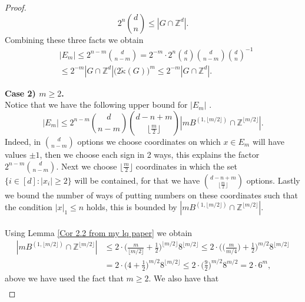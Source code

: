 \documentclass[a4paper,oneside, reqno]{amsart}
\numberwithin{equation}{section}
\theoremstyle{definition}%
\theoremstyle{definition}
\theoremstyle{definition}%
\theoremstyle{definition}
\newcommand{\Z}{\mathbb{Z}}
\begin{document}
\begin{proof}
\begin{equation}
 2^n \binom{d}{n} \leq |G \cap \mathbb{Z}^d |.
\end{equation}
Combining these three facts we obtain
\begin{align*}
    &|E_m| \le 2^{n-m} \binom{d}{n-m}= 2^{-m} \cdot 2^{n} \binom{d}{n} \binom{d}{n-m}  \binom{d}{n}^{-1} \\
    &\le 2^{-m} |G \cap \Z^d| \Big( 2\widetilde{\kappa}(G)\Big)^m \le 2^{-m} |G \cap \Z^d|.
\end{align*}
\par \textbf{Case 2) $m \ge 2$.} \\
Notice that we have the following upper bound for $|E_m|$ . 
\begin{equation} \label{eq:3.3}
|E_m| \leq 2^{n-m} \binom{d}{n-m} \binom{d-n+m}{\lfloor \frac{m}{2} \rfloor} |mB^{(1,\lfloor m/2 \rfloor)} \cap \mathbb{Z}^{\lfloor m/2\rfloor} |. 
\end{equation}
Indeed, in $\binom{d}{n-m}$ options we choose coordinates on which $x \in E_m$ will have values $\pm 1$, then we choose each sign in 2 ways, this explains the factor $2^{n-m} \binom{d}{n-m}$. Next we choose $\lfloor \frac{m}{2} \rfloor$ coordinates  in which the set $\lbrace i \in [d]: |x_i| \geq 2 \rbrace$ will be contained, for that we have $\binom{d-n+m}{\lfloor \frac{m}{2} \rfloor}$ options. Lastly we bound the number of ways of putting numbers on these coordinates such that the condition $| x |_{1} \leq n$ holds, this is bounded by $|mB^{(1,\lfloor m/2 \rfloor)} \cap \mathbb{Z}^{\lfloor m/2 \rfloor}|$. \\ \\
Using Lemma \ref{Cor 2.2 from my lq paper} we obtain 
\begin{equation} \label{eq:3.4}
    \begin{split}
        |mB^{(1,\lfloor m/2 \rfloor)} \cap \mathbb{Z}^{\lfloor m/2 \rfloor}| &\leq 2 \cdot \Big( \frac{m}{\lfloor m/2\rfloor}+\frac{1}{2} \Big)^{\lfloor m/2 \rfloor} 8^{\lfloor m/2 \rfloor} \leq 2 \cdot \Big( \Big( \frac{m}{m/4} \Big)+ \frac{1}{2} \Big)^{m/2} 8^{\lfloor m/2 \rfloor}  \\
 &= 2 \cdot\Big( 4+ \frac{1}{2} \Big)^{m/2} 8^{\lfloor m/2 \rfloor} \leq  2 \cdot\Big( \frac{9}{2} \Big)^{m/2} 8^{m/2}= 2 \cdot 6^{m},
    \end{split}
\end{equation}
above we have used the fact that $m  \geq 2$.
We also have that
\begin{equation} \label{eq:3.5}
    \begin{split}

\end{split}
\end{equation}
\end{proof}
\end{document}
